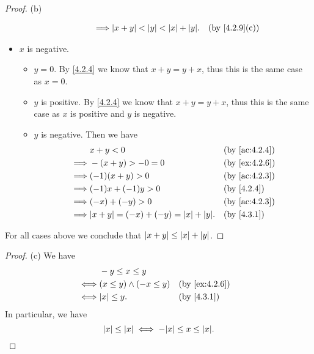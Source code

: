 \begin{proof}{(b)}
\begin{itemize}
\begin{itemize}
\begin{itemize}
\begin{align*}
                            \implies & \abs{x + y} < \abs{y} < \abs{x} + \abs{y}. &  & \text{(by \cref{4.2.9}(c))}
                          \end{align*}
                  \end{itemize}
          \end{itemize}
    \item \(x\) is negative.
          \begin{itemize}
            \item \(y = 0\).
                  By \cref{4.2.4} we know that \(x + y = y + x\), thus this is the same case as \(x = 0\).
            \item \(y\) is positive.
                  By \cref{4.2.4} we know that \(x + y = y + x\), thus this is the same case as \(x\) is positive and \(y\) is negative.
            \item \(y\) is negative.
                  Then we have
                  \begin{align*}
                             & x + y < 0                                      &  & \text{(by \cref{ac:4.2.4})} \\
                    \implies & -(x + y) > -0 = 0                              &  & \text{(by \cref{ex:4.2.6})} \\
                    \implies & (-1)(x + y) > 0                                &  & \text{(by \cref{ac:4.2.3})} \\
                    \implies & (-1)x + (-1)y > 0                              &  & \by{4.2.4}                  \\
                    \implies & (-x) + (-y) > 0                                &  & \text{(by \cref{ac:4.2.3})} \\
                    \implies & \abs{x + y} = (-x) + (-y) = \abs{x} + \abs{y}. &  & \by{4.3.1}
                  \end{align*}
          \end{itemize}
  \end{itemize}
  For all cases above we conclude that \(\left\lvert x + y\right\rvert \leq \left\lvert x\right\rvert + \left\lvert y\right\rvert\).
\end{proof}

\begin{proof}{(c)}
  We have
  \begin{align*}
         & -y \leq x \leq y                                              \\
    \iff & (x \leq y) \land (-x \leq y) &  & \text{(by \cref{ex:4.2.6})} \\
    \iff & \abs{x} \leq y.              &  & \by{4.3.1}
  \end{align*}
  In particular, we have
  \[
    \abs{x} \leq \abs{x} \iff -\abs{x} \leq x \leq \abs{x}.
  \]
\end{proof}

